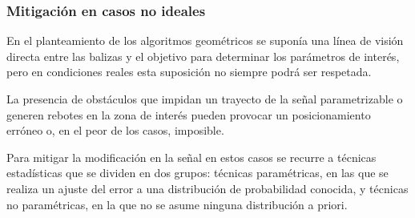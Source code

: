 \subsubsection{Mitigación en casos no ideales}

En el planteamiento de los algoritmos geométricos se suponía una línea de visión directa entre las balizas y el objetivo para determinar los parámetros de interés, pero en condiciones reales esta suposición no siempre podrá ser respetada.

La presencia de obstáculos que impidan un trayecto de la señal parametrizable o generen rebotes en la zona de interés pueden provocar un posicionamiento erróneo o, en el peor de los casos, imposible.

Para mitigar la modificación en la señal en estos casos se recurre a técnicas estadísticas que se dividen en dos grupos: técnicas paramétricas, en las que se realiza un ajuste del error a una distribución de probabilidad conocida, y técnicas no paramétricas, en la que no se asume ninguna distribución a priori.





